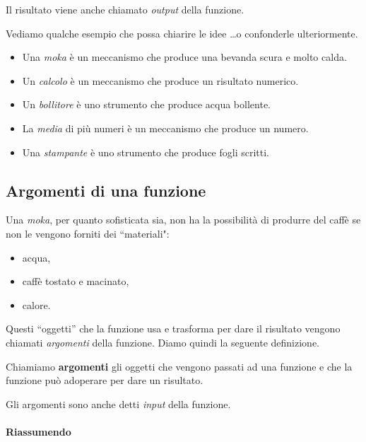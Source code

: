 Il risultato viene anche chiamato \emph{output} della funzione.
 
\begin{esempio}
Vediamo qualche esempio che possa chiarire le idee \dots o confonderle 
ulteriormente.
\begin{itemize} [noitemsep]
\item Una \emph{moka} è un meccanismo che produce una bevanda scura e 
molto calda.
\item Un \emph{calcolo} è un meccanismo che produce un risultato numerico.
\item Un \emph{bollitore} è uno strumento che produce acqua bollente.
\item La \emph{media}  di più numeri è un meccanismo che produce un numero.
\item Una \emph{stampante} è uno strumento che produce fogli scritti.
\end{itemize}
\end{esempio}

\subsection{Argomenti di una funzione}
\label{subsec:funzioni2_argomenti}

Una \emph{moka}, per quanto sofisticata sia, non ha la possibilità di 
produrre del caffè se non le vengono forniti dei  ``materiali":
\begin{itemize} [noitemsep]
\item acqua,
\item caffè tostato e macinato,
\item calore.
\end{itemize}

Questi  ``oggetti'' che la funzione usa e trasforma per dare il risultato 
vengono chiamati \emph{argomenti} della funzione.
Diamo quindi la seguente definizione.

\begin{definizione}
Chiamiamo \textbf{argomenti} gli oggetti che vengono passati ad 
una funzione e che la funzione può adoperare per dare un risultato.
\end{definizione}

Gli argomenti sono anche detti \emph{input} della funzione.

\paragraph{Riassumendo}


